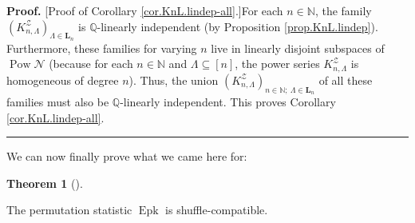 \documentclass[numbers=enddot,12pt,final,onecolumn,notitlepage]{scrartcl}%
\theoremstyle{definition}
\newtheorem{theo}{Theorem}[section]
\newenvironment{theorem}[1][]
{\begin{theo}[#1]\begin{leftbar}}
{\end{leftbar}\end{theo}}
\newenvironment{proof}[1][Proof]{\noindent\textbf{#1.} }{\ \rule{0.5em}{0.5em}}
\newenvironment{verlong}{}{}
\newcommand{\NN}{\mathbb{N}}
\begin{document}
\begin{verlong}
\begin{proof}
[Proof of Corollary \ref{cor.KnL.lindep-all}.]For each $n\in\mathbb{N}$, the
family
$\left(  K_{n,\Lambda}^{\mathcal{Z}}\right)  _{\Lambda\in \mathbf{L}_n}$
is $\mathbb{Q}$-linearly
independent (by Proposition \ref{prop.KnL.lindep}). Furthermore, these
families for varying $n$ live in linearly disjoint subspaces of
$\operatorname*{Pow}\mathcal{N}$ (because for each $n \in \NN$ and $\Lambda
\subseteq\left[  n\right]  $, the power series $K_{n,\Lambda}^{\mathcal{Z}}$
is homogeneous of degree $n$). Thus, the union $\left(  K_{n,\Lambda
}^{\mathcal{Z}}\right)  _{n \in \NN;\ \Lambda \in \mathbf{L}_n}$ of all
these families must also be $\mathbb{Q}%
$-linearly independent.
This proves Corollary \ref{cor.KnL.lindep-all}.
\end{proof}
\end{verlong}

We can now finally prove what we came here for:


\begin{theorem}
\label{thm.Epk.sh-co-a}The permutation statistic $\operatorname{Epk}$ is shuffle-compatible.
\end{theorem}
\end{document}
